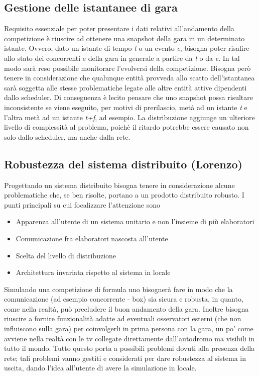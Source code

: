 \subsection{Gestione delle istantanee di gara}
Requisito essenziale per poter presentare i dati relativi all'andamento della
competizione è riuscire ad ottenere una
snapshot della gara in un determinato istante. Ovvero, dato un istante di tempo
\emph{t} o un evento \emph{e}, bisogna
poter risalire allo stato dei concorrenti e della gara in generale a partire da \emph{t} o da \emph{e}. 
In tal modo sarà reso possibile
monitorare l'evolversi della competizione. Bisogna però tenere in considerazione
che qualunque entità provveda allo scatto
dell'istantanea sarà soggetta alle stesse problematiche legate alle altre entità
attive dipendenti dallo scheduler. 
Di conseguenza è lecito pensare che uno snapshot possa risultare inconsistente
se viene eseguito, per motivi di 
prerilascio, metà ad un istante
\emph{t} e l'altra metà ad un istante \emph{t+f}, ad esempio. La distribuzione
aggiunge un ulteriore livello di complessità
al problema, poichè il ritardo potrebbe essere causato non solo dallo scheduler,
ma anche dalla rete.
\subsection{Robustezza del sistema distribuito (Lorenzo)}
Progettando un sistema distribuito bisogna tenere in considerazione alcune
problematiche che, se ben risolte, portano a un prodotto distribuito robusto.
I punti principali su cui focalizzare l'attenzione sono
\begin{itemize}
\item Apparenza all'utente di un sistema unitario e non l'insieme di pi\`{u}
elaboratori
\item Comunicazione fra elaboratori nascosta all'utente
\item Scelta del livello di distribuzione
\item Architettura invariata rispetto al sistema in locale
\end{itemize}
Simulando una competizione di formula uno bisognerà fare in modo che la comunicazione (ad esempio concorrente - box) sia sicura e robusta, in quanto, come nella realtà, può precludere il buon andamento della gara. Inoltre bisogna riuscire a fornire funzionalità adatte ad eventuali osservatori esterni (che non influiscono sulla gara) per coinvolgerli in prima persona con la gara, un po' come avviene nella realtà con le tv collegate direttamente dall'autodromo ma visibili in tutto il mondo. Tutto questo porta a possibili problemi dovuti alla presenza della rete; tali problemi vanno gestiti e considerati per dare robustezza al sistema in uscita, dando l'idea all'utente di avere la simulazione in locale.
